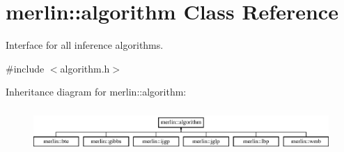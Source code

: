 \hypertarget{classmerlin_1_1algorithm}{}\section{merlin\+:\+:algorithm Class Reference}
\label{classmerlin_1_1algorithm}


Interface for all inference algorithms.  




{\ttfamily \#include $<$algorithm.\+h$>$}

Inheritance diagram for merlin\+:\+:algorithm\+:\begin{figure}[H]
\begin{center}
\leavevmode
\includegraphics[height=1.681682cm]{classmerlin_1_1algorithm}
\end{center}
\end{figure}
